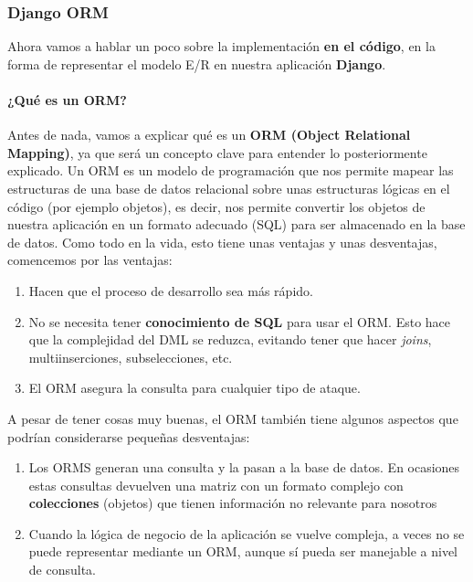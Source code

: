     \subsubsection{Django ORM}

    Ahora vamos a hablar un poco sobre la implementación \textbf{en el código}, en la forma
    de representar el modelo E/R en nuestra aplicación \textbf{Django}.\\

    \paragraph{¿Qué es un ORM?} \underline{}                                            
    \newline Antes de nada, vamos a explicar qué es un \textbf{ORM (Object Relational Mapping)}, ya
    que será un concepto clave para entender lo posteriormente explicado. Un ORM es un modelo
    de programación que nos permite mapear las estructuras de una base de datos relacional
    sobre unas estructuras lógicas en el código (por ejemplo objetos), es decir, nos permite
    convertir los objetos de nuestra aplicación en un formato adecuado (SQL) para ser
    almacenado en la base de datos. Como todo en la vida, esto tiene unas ventajas y unas
    desventajas, comencemos por las ventajas:

        \begin{enumerate}
            \item Hacen que el proceso de desarrollo sea más rápido.
            \item No se necesita tener \textbf{conocimiento de SQL} para usar el ORM. Esto
            hace que la complejidad del DML se reduzca, evitando tener que hacer
            \textit{joins}, multiinserciones, subselecciones, etc.
            \item El ORM asegura la consulta para cualquier tipo de ataque.
        \end{enumerate}

    A pesar de tener cosas muy buenas, el ORM también tiene algunos aspectos que podrían
    considerarse pequeñas desventajas:

        \begin{enumerate}
            \item Los ORMS generan una consulta y la pasan a la base de datos. En ocasiones
            estas consultas devuelven una matriz con un formato complejo con
            \textbf{colecciones} (objetos) que tienen información no relevante para nosotros
            \item Cuando la lógica de negocio de la aplicación se vuelve compleja, a veces
            no se puede representar mediante un ORM, aunque sí pueda ser manejable a nivel
            de consulta.
        \end{enumerate}

